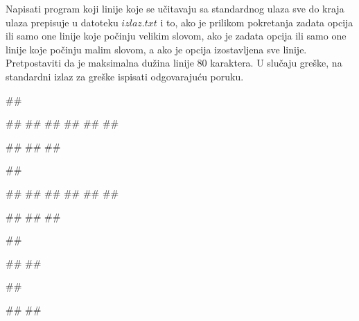 \begin{Exercise}[label=p3_09] 
 Napisati program koji linije koje se učitavaju sa standardnog ulaza sve do kraja ulaza 
 prepisuje u datoteku $izlaz.txt$ i to, ako je prilikom pokretanja zadata opcija 
  ili  samo one linije koje počinju velikim slovom, 
 ako je zadata opcija  ili  samo one linije koje počinju malim slovom, 
 a ako je opcija izostavljena sve linije.
 Pretpostaviti da je maksimalna dužina linije $80$ karaktera.
 U slučaju greške, na standardni izlaz za greške ispisati odgovarajuću poruku.

\begin{miditest}
\begin{upotreba}{1}
##

#\naslovInt#
##
##
##
##
##

##
##
##
\end{upotreba}
\end{miditest}
\begin{miditest}
\begin{upotreba}{2}
##

#\naslovInt#
##
##
##
##
##

##
##
##
\end{upotreba}
\end{miditest}

\begin{miditest}
\begin{upotreba}{3}
##

#\naslovIzlazZaGresku#
##
\end{upotreba}
\end{miditest}
\begin{miditest}
\begin{upotreba}{4}
##

#\naslovIzlazZaGresku#
##
\end{upotreba}
\end{miditest}
\end{Exercise}
\begin{Answer}[ref=p3_09]
\end{Answer}


